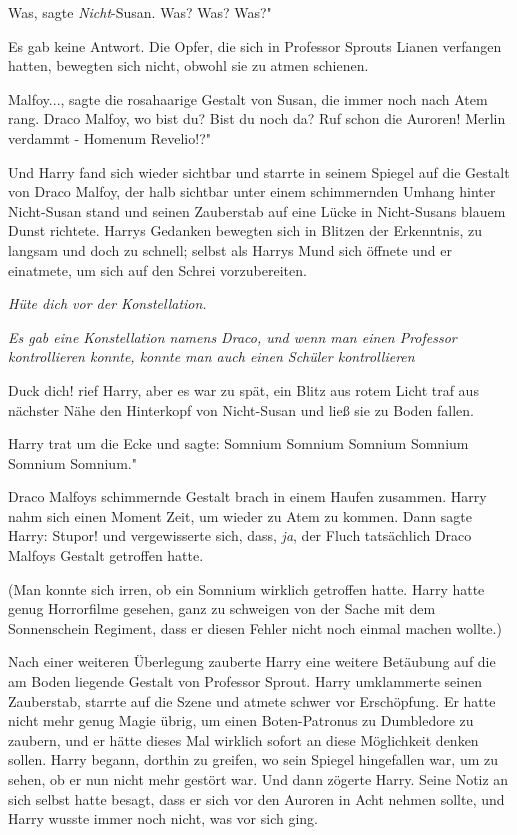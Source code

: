 \glqq Was\grqq{}, sagte \emph{Nicht}-Susan. \glqq Was? Was? Was?"

Es gab keine Antwort. Die Opfer, die sich in Professor Sprouts Lianen verfangen
hatten, bewegten sich nicht, obwohl sie zu atmen schienen.

\glqq Malfoy...\grqq{}, sagte die rosahaarige Gestalt von Susan, die immer noch
nach Atem rang. \glqq Draco Malfoy, wo bist du? Bist du noch da? Ruf schon die
Auroren! Merlin verdammt - Homenum Revelio!?"

Und Harry fand sich wieder sichtbar und starrte in seinem Spiegel auf die
Gestalt von Draco Malfoy, der halb sichtbar unter einem schimmernden Umhang
hinter Nicht-Susan stand und seinen Zauberstab auf eine Lücke in Nicht-Susans
blauem Dunst richtete. Harrys Gedanken bewegten sich in Blitzen der Erkenntnis,
zu langsam und doch zu schnell; selbst als Harrys Mund sich öffnete und er
einatmete, um sich auf den Schrei vorzubereiten.

\emph{Hüte dich vor der Konstellation.}

\emph{Es gab eine Konstellation namens Draco, und wenn man einen Professor
kontrollieren konnte, konnte man auch einen Schüler kontrollieren}

\glqq Duck dich!\grqq{} rief Harry, aber es war zu spät, ein Blitz aus rotem
Licht traf aus nächster Nähe den Hinterkopf von Nicht-Susan und ließ sie zu
Boden fallen.

Harry trat um die Ecke und sagte: \glqq Somnium Somnium Somnium Somnium Somnium
Somnium."

Draco Malfoys schimmernde Gestalt brach in einem Haufen zusammen. Harry nahm
sich einen Moment Zeit, um wieder zu Atem zu kommen. Dann sagte Harry: \glqq
Stupor!\grqq{} und vergewisserte sich, dass, \emph{ja}, der Fluch tatsächlich
Draco Malfoys Gestalt getroffen hatte.

(Man konnte sich irren, ob ein Somnium wirklich getroffen hatte. Harry hatte
genug Horrorfilme gesehen, ganz zu schweigen von der Sache mit dem Sonnenschein
Regiment, dass er diesen Fehler nicht noch einmal machen wollte.)

Nach einer weiteren Überlegung zauberte Harry eine weitere Betäubung auf die am
Boden liegende Gestalt von Professor Sprout. Harry umklammerte seinen
Zauberstab, starrte auf die Szene und atmete schwer vor Erschöpfung. Er hatte
nicht mehr genug Magie übrig, um einen Boten-Patronus zu Dumbledore zu zaubern,
und er hätte dieses Mal wirklich sofort an diese Möglichkeit denken sollen.
Harry begann, dorthin zu greifen, wo sein Spiegel hingefallen war, um zu sehen,
ob er nun nicht mehr gestört war. Und dann zögerte Harry. Seine Notiz an sich
selbst hatte besagt, dass er sich vor den Auroren in Acht nehmen sollte, und
Harry wusste immer noch nicht, was vor sich ging.


